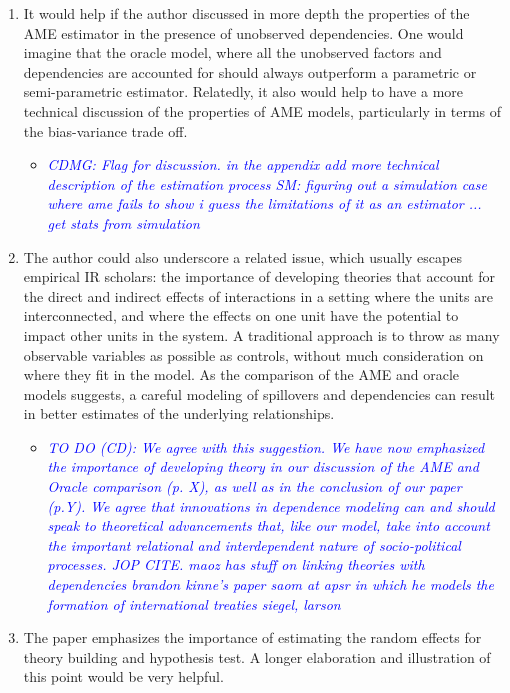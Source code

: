 \begin{enumerate}
	\item It would help if the author discussed in more depth the properties of the AME estimator in the presence of unobserved dependencies. One would imagine that the oracle model, where all the unobserved factors and dependencies are accounted for should always outperform a parametric or semi-parametric estimator. Relatedly, it also would help to have a more technical discussion of the properties of AME models, particularly in terms of the bias-variance trade off.
	\begin{itemize}
		\item \textcolor{blue}{ \emph{
		CDMG: Flag for discussion.
		in the appendix add more technical description of the estimation process
		SM: figuring out a simulation case where ame fails to show i guess the limitations of it as an estimator ...
		get stats from simulation
		}}
	\end{itemize}
	\item The author could also underscore a related issue, which usually escapes empirical IR scholars: the importance of developing theories that account for the direct and indirect effects of interactions in a setting where the units are interconnected, and where the effects on one unit have the potential to impact other units in the system. A traditional approach is to throw as many observable variables as possible as controls, without much consideration on where they fit in the model. As the comparison of the AME and oracle models suggests, a careful modeling of spillovers and dependencies can result in better estimates of the underlying relationships.
	\begin{itemize}
		\item \textcolor{blue}{ \emph{
		TO DO (CD): We agree with this suggestion. We have now emphasized the importance of developing theory in our discussion of the AME and Oracle comparison (p. X), as well as in the conclusion of our paper (p.Y). We agree that innovations in dependence modeling can and should speak to theoretical advancements that, like our model, take into account the important relational and interdependent nature of socio-political processes. JOP CITE.
		maoz has stuff on linking theories with dependencies
		brandon kinne's paper saom at apsr in which he models the formation of international treaties
		siegel, larson
		}}
	\end{itemize}
	\item The paper emphasizes the importance of estimating the random effects for theory building and hypothesis test. A longer elaboration and illustration of this point would be very helpful.

\end{enumerate}
